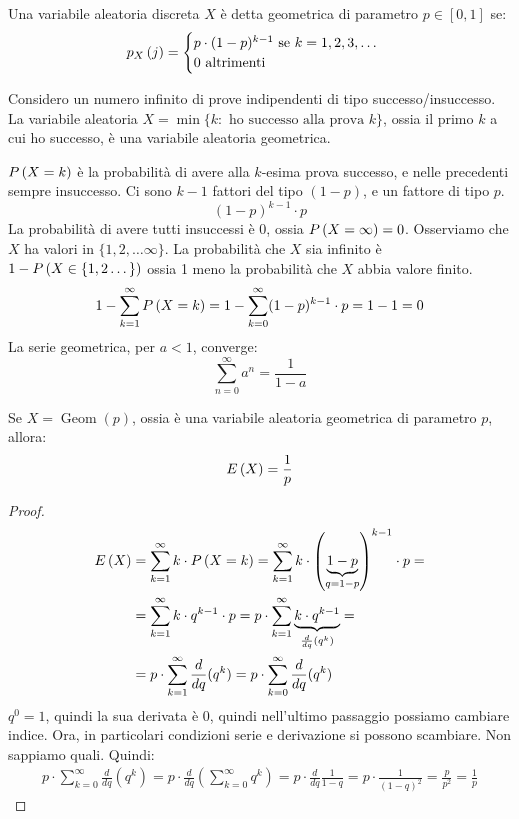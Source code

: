 \begin{defn}
Una variabile aleatoria discreta $X$ \`e detta geometrica di parametro $p \in [0,1]$ se:
\[
p_{X} \left( j \right) = 
\begin{cases}
p \cdot (1 - p)^{k-1} \text{ se } k = 1,2,3, \ldots \\
0 \text{ altrimenti}
\end{cases}
\]
\end{defn}
\begin{exmp}
Considero un numero infinito di prove indipendenti di tipo successo/insuccesso. La variabile aleatoria $X = \min \{ k : \text{ ho successo alla prova } k \}$, ossia il primo $k$ a cui ho successo, \`e una variabile aleatoria geometrica.

$P \left( {X = k} \right)$ \`e la probabilit\`a di avere alla $k$-esima prova successo, e nelle precedenti sempre insuccesso. Ci sono $k-1$ fattori del tipo $(1-p)$, e un fattore di tipo $p$.
\[
(1-p)^{k-1} \cdot p
\]
La probabilit\`a di avere tutti insuccessi \`e $0$, ossia $P \left( {X = \infty} \right) = 0$. Osserviamo che $X$ ha valori in $\{ 1, 2, \dots \infty \}$. La probabilit\`a che $X$ sia infinito \`e $1 - P \left( {X \in \{1, 2 \dots\}} \right)$ ossia 1 meno la probabilit\`a che $X$ abbia valore finito.
\[
1 - \sum_{k = 1}^{\infty} P \left( {X = k} \right) = 1 - \sum_{k = 0}^{\infty} (1-p)^{k-1} \cdot p = 1 - 1 = 0
\]
La serie geometrica, per $a < 1$, converge:
\[
\sum_{n = 0}^{\infty} a^n = \frac{1}{1 - a}
\]
\end{exmp}
\begin{theorem}
Se $X = \operatorname{Geom}(p)$, ossia \`e una variabile aleatoria geometrica di parametro $p$, allora:
\[
E \left( X \right) = \frac{1}{p}
\]
\end{theorem}
\begin{proof}
\begin{align*}
E \left( X \right) &= \sum_{k = 1}^{\infty} k \cdot P \left( {X = k} \right) = \sum_{k = 1}^{\infty} k \cdot {\left( \underbrace{1 - p}_{q = 1 - p} \right)}^{k-1} \cdot p = \\
&= \sum_{k = 1}^{\infty} k \cdot q^{k-1} \cdot p = p \cdot \sum_{k = 1}^{\infty} \underbrace{k \cdot q^{k-1}}_{\frac{d}{dq} (q^k)} = \\
&= p \cdot \sum_{k = 1}^{\infty} \frac{d}{dq} (q^k) = p \cdot \sum_{k = 0}^{\infty} \frac{d}{dq} (q^k)
\end{align*}
$q^0 = 1$, quindi la sua derivata \`e 0, quindi nell'ultimo passaggio possiamo cambiare indice. Ora, in particolari condizioni serie e derivazione si possono scambiare. Non sappiamo quali. Quindi:
\begin{align*}
p \cdot \sum_{k = 0}^{\infty} \frac{d}{dq} (q^k) =
p \cdot \frac{d}{dq} \left( \sum_{k = 0}^{\infty} q^k \right) =
p \cdot \frac{d}{dq} \frac{1}{1 - q} = p \cdot \frac{1}{(1 - q)^2} = 
\frac{p}{p^2} = \frac{1}{p}
\end{align*}
\end{proof}

